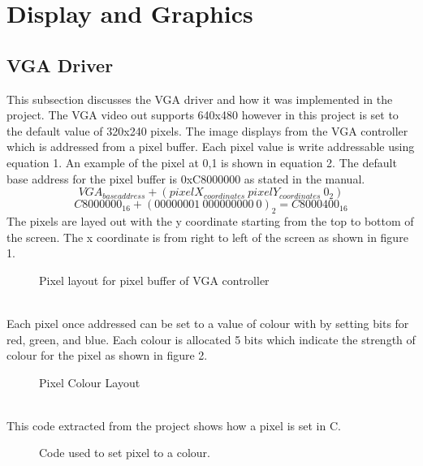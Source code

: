 \documentclass[a4paper,12pt]{article}
\begin{document}
\section{Display and Graphics}
\subsection{VGA Driver}
\begin{flushleft}
This subsection discusses the VGA driver and how it was implemented in the project. The VGA video out supports 640x480 however in this project is set to the default value of 320x240 pixels. The image displays from the VGA controller which is addressed from a pixel buffer. Each pixel value is write addressable using equation 1. An example of the pixel at 0,1 is shown in equation 2. The default base address for the pixel buffer is 0xC8000000 as stated in the manual. \cite{altera_2014} 
\begin{equation}
	VGA_{base address} + (pixelX_{coordinates}\:pixelY_{coordinates}\:0_{2})
\end{equation}
\begin{equation}
	C8000000_{16} + (00000001\:000000000\:0)_{2} = C8000400_{16}
\end{equation}
The pixels are layed out with the y coordinate starting from the top to bottom of the screen. The x coordinate is from right to left of the screen as shown in figure 1.
\begin{figure}[H]
	\centering
	\caption{Pixel layout for pixel buffer of VGA controller \cite{altera_2014}}
\end{figure}
\- \\
Each pixel once addressed can be set to a value of colour with by setting bits for red, green, and blue. Each colour is allocated 5 bits which indicate the strength of colour for the pixel as shown in figure 2. 
\begin{figure}[H]
	\centering
	\caption{Pixel Colour Layout \cite{altera_2014}}
\end{figure}
\- \\
This code extracted from the project shows how a pixel is set in C.
\begin{figure}[H]
	\centering
	
		\caption{Code used to set pixel to a colour.}
\end{figure}
\end{flushleft}
\newpage
\end{document}
